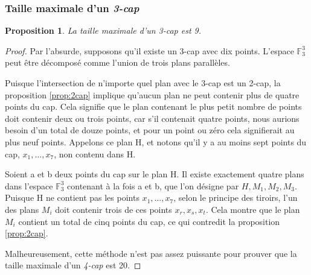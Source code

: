\documentclass[a4paper,12pt,titlepage]{article}
\theoremstyle{plain}
\newtheorem{prop}{Proposition}
\theoremstyle{definition}
\newcommand{\Ftrois}[1]{\mathbb{F}^#1_3}
\begin{document}
\subsubsection{Taille maximale d'un \emph{3-cap}}
\begin{prop} \label{prop:3cap}
La taille maximale d'un \emph{3-cap} est 9.
\end{prop}
\begin{proof}
Par l'absurde, supposons qu'il existe un 3-cap avec dix points. L'espace $\Ftrois{3}$ peut être décomposé comme l'union de trois plans parallèles.

Puisque l'intersection de n'importe quel plan avec le 3-cap est un 2-cap, la proposition \ref{prop:2cap} implique qu'aucun plan ne peut contenir plus de quatre points du cap. Cela signifie que le plan contenant le plus petit nombre de points doit contenir deux ou trois points, car s'il contenait quatre points, nous aurions besoin d'un total de douze points, et pour un point ou zéro cela signifierait au plus neuf points. Appelons  ce plan H, et notons qu’il y a au moins sept points du cap, $x_1,\dots ,x_7$, non contenu dans H.
    
Soient a et b deux points du cap sur le plan H. Il existe exactement quatre plans dans l'espace $\Ftrois{3}$ contenant à la fois a et b, que l'on désigne par $H, M_1, M_2, M_3$. Puisque H ne contient pas les points $x_1,\dots ,x_7$, selon le principe des tiroirs, l'un des plans $M_i$ doit contenir trois de ces points $x_r, x_s, x_t$. Cela montre que le plan $M_i$ contient un total de cinq points du cap, ce qui contredit la proposition \ref{prop:2cap}.
    
Malheureusement, cette méthode n'est pas assez puissante pour prouver que la taille maximale d'un \emph{4-cap} est 20.
\end{proof}
\end{document}

